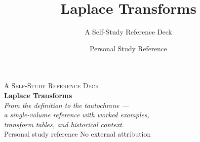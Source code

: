 \documentclass[aspectratio=169,11pt]{beamer}
\title{Laplace Transforms}
\subtitle{A Self-Study Reference Deck}
\author{Personal Study Reference}
\date{}
\begin{document}

{
\begin{frame}[plain]
  \vspace{2cm}
  \begin{center}
    {\color{accentorange}\small\textsc{A Self-Study Reference Deck}}\\[0.6cm]
    {\color{white}\Huge\textbf{Laplace Transforms}}\\[0.5cm]
    {\color{white!85}\large\itshape From the definition to the tautochrone ---\\
    a single-volume reference with worked examples,\\
    transform tables, and historical context.}\\[1cm]
    {\color{white!70}\footnotesize Personal study reference \quad\textbar\quad No external attribution}
  \end{center}
\end{frame}
}
\end{document}

